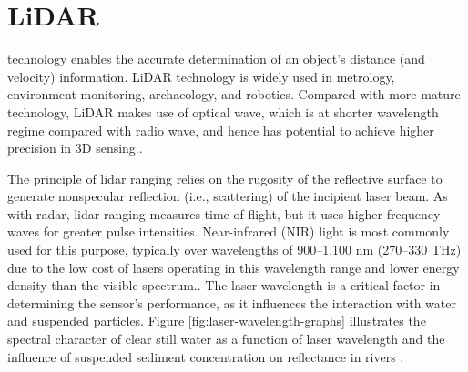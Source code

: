 \section{LiDAR}

 technology enables the accurate determination of an object's distance (and velocity) information. LiDAR technology is widely used in metrology, environment monitoring, archaeology, and robotics. Compared with more mature  technology, LiDAR makes use of optical wave, which is at shorter wavelength regime compared with radio wave, and hence has potential to achieve higher precision in 3D sensing.\cite{li_2022_a, lednev_2013_remote,behroozpour_2017_lidar,javaid_2021_sensors}.

The principle of lidar ranging relies on the rugosity of the reflective surface to generate nonspecular reflection (i.e., scattering) of the incipient laser beam. As with radar, lidar ranging measures time of flight, but it uses higher frequency waves for greater pulse intensities. Near-infrared (NIR) light is most commonly used for this purpose, typically over wavelengths of 900–1,100 nm (270–330 THz) due to the low cost of lasers operating in this wavelength range and lower energy density than the visible spectrum.\cite{li_2022_a, fernandezdiaz_2014_early, smart_2009_river, behroozpour_2017_lidar}. The laser wavelength is a critical factor in determining the sensor's performance, as it influences the interaction with water and suspended particles. Figure \ref{fig:laser-wavelength-graphs} illustrates the spectral character of clear still water as a function of laser wavelength and the influence of suspended sediment concentration on reflectance in rivers \cite{lednev_2013_remote,milan_2010_mapping,paul_2020_a}.

